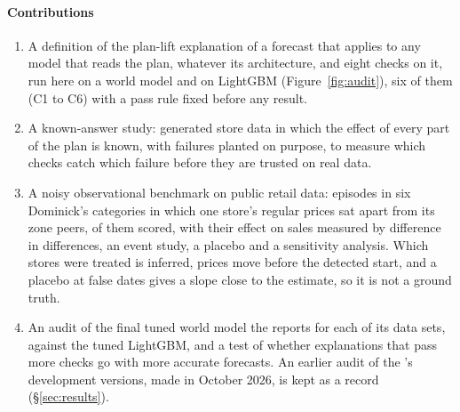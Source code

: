 \paragraph{Contributions}
\begin{enumerate}\setlength{\itemsep}{1pt}
\item A definition of the plan-lift explanation of a forecast that applies to
any model that reads the plan, whatever its architecture, and eight checks on
it, run here on a world model and on LightGBM
(Figure~\ref{fig:audit}), six of them (C1 to C6) with a pass rule fixed before
any result.
\item A known-answer study: generated store data in which the effect of every
part of the plan is known, with failures planted on purpose, to measure which
checks catch which failure before they are trusted on real data.
\item A noisy observational benchmark on public retail data: \zEpisodes{}
episodes in six Dominick's categories in which one store's regular prices sat
apart from its zone peers, \zScored{} of them scored, with their effect on
sales measured by difference in differences, an event study, a placebo and a
sensitivity analysis. Which stores were treated is inferred, prices move before
the detected start, and a placebo at false dates gives a slope close to the
estimate, so it is not a ground truth.
\item An audit of the final tuned world model the \companion{}  reports for
each of its \tSets{} data sets, against the tuned LightGBM, and a test of
whether explanations that pass more checks go with more accurate forecasts. An
earlier audit of the \companion{} 's development versions, made in October
2026, is kept as a record (\S\ref{sec:results}).
\end{enumerate}

